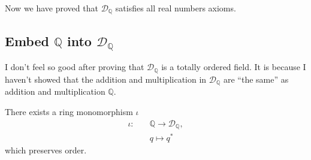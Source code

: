 Now we have proved that $\mathscr{D}_{\mathbb{Q}}$ satisfies all real numbers axioms.

\subsection{Embed $\mathbb{Q}$ into $\mathscr{D}_{\mathbb{Q}}$}

I don't feel so good after proving that $\mathscr{D}_{\mathbb{Q}}$ is a totally ordered field. It is because I haven't showed that the addition and multiplication in $\mathscr{D}_{\mathbb{Q}}$ are ``the same'' as addition and multiplication $\mathbb{Q}$.

\begin{theorem}
    There exists a ring monomorphism $\iota$
    \[
        \begin{split}
            \iota:\quad & \mathbb{Q}\to\mathscr{D}_{\mathbb{Q}}, \\
            & q\mapsto {q}^{*}
        \end{split}
    \]
    which preserves order.
\end{theorem}

